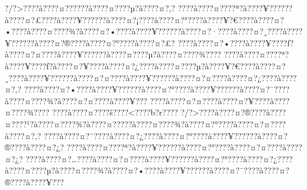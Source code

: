 \documentclass[11pt, openany]{book}
\begin{document}
?/?\textgreater{}???\textbar{}?à???\textbar{}?¤?????\textbar{}?à???\textbar{}?¤???\textbar{}?µ?à???\textbar{}?¤?‚?
???\textbar{}?à???\textbar{}?¤???\textbar{}?ª?à???\textbar{}?¥?????\textbar{}?à???\textbar{}?¤?£???\textbar{}?à???\textbar{}?¥?????\textbar{}?à???\textbar{}?¤?¡???\textbar{}?à???\textbar{}?¤?°???\textbar{}?à???\textbar{}?¥?€???\textbar{}?à???\textbar{}?¤?•???\textbar{}?à???\textbar{}?¤???\textbar{}?¾?à???\textbar{}?¤?•???\textbar{}?à???\textbar{}?¥?????\textbar{}?à???\textbar{}?¤?·???\textbar{}?à???\textbar{}?¤?¸???\textbar{}?à???\textbar{}?¥?????\textbar{}?à???\textbar{}?¤?®???\textbar{}?à???\textbar{}?¤?°???\textbar{}?à???\textbar{}?¤?£?
???\textbar{}?à???\textbar{}?¤?•???\textbar{}?à???\textbar{}?¥???\textbar{}?ƒ?à???\textbar{}?¤?¤???\textbar{}?à???\textbar{}?¥?????\textbar{}?à???\textbar{}?¤???\textbar{}?µ?à???\textbar{}?¤???\textbar{}?¾???\textbar{}?
???\textbar{}?à???\textbar{}?¤???\textbar{}?ª?à???\textbar{}?¥???\textbar{}?ƒ?à???\textbar{}?¤?¥???\textbar{}?à???\textbar{}?¤?¿???\textbar{}?à???\textbar{}?¤???\textbar{}?µ?à???\textbar{}?¥?€???\textbar{}?à???\textbar{}?¤?¸???\textbar{}?à???\textbar{}?¥?????\textbar{}?à???\textbar{}?¤?¤???\textbar{}?à???\textbar{}?¥?????\textbar{}?à???\textbar{}?¤?¤???\textbar{}?à???\textbar{}?¤?¿???\textbar{}?à???\textbar{}?¤?‚?
???\textbar{}?à???\textbar{}?¤?•???\textbar{}?à???\textbar{}?¥?????\textbar{}?à???\textbar{}?¤?°???\textbar{}?à???\textbar{}?¥?????\textbar{}?à???\textbar{}?¤?¯???\textbar{}?à???\textbar{}?¤???\textbar{}?¾?à???\textbar{}?¤?¤???\textbar{}?à???\textbar{}?¥???
???\textbar{}?à???\textbar{}?¤?¤???\textbar{}?à???\textbar{}?¤?¥???\textbar{}?à???\textbar{}?¤???\textbar{}?¾???\textbar{}?
???\textbar{}?à???\textbar{}?¤???\textbar{}?š???\textbar{}?\textless{}???\textbar{}?b?r???\textbar{}?
?/?\textgreater{}???\textbar{}?à???\textbar{}?¤?®???\textbar{}?à???\textbar{}?¤???\textbar{}?¹?à???\textbar{}?¤???\textbar{}?¾?à???\textbar{}?¤?­???\textbar{}?à???\textbar{}?¤???\textbar{}?¾?à???\textbar{}?¤?°???\textbar{}?à???\textbar{}?¤?¤???\textbar{}?à???\textbar{}?¤?‚?
???\textbar{}?à???\textbar{}?¤?¨???\textbar{}?à???\textbar{}?¤?¿???\textbar{}?à???\textbar{}?¤?°???\textbar{}?à???\textbar{}?¥?????\textbar{}?à???\textbar{}?¤?®???\textbar{}?à???\textbar{}?¤?¿?
???\textbar{}?à???\textbar{}?¤???\textbar{}?ª?à???\textbar{}?¥?????\textbar{}?à???\textbar{}?¤?°???\textbar{}?à???\textbar{}?¤?¤???\textbar{}?à???\textbar{}?¤?¿?
???\textbar{}?à???\textbar{}?¤?\ldots{}???\textbar{}?à???\textbar{}?¤?¤???\textbar{}?à???\textbar{}?¥?????\textbar{}?à???\textbar{}?¤?°???\textbar{}?à???\textbar{}?¤?¿???\textbar{}?à???\textbar{}?¤???\textbar{}?µ?à???\textbar{}?¤???\textbar{}?¾?à???\textbar{}?¤?•???\textbar{}?à???\textbar{}?¥?????\textbar{}?à???\textbar{}?¤?¯???\textbar{}?à???\textbar{}?¤?®???\textbar{}?à???\textbar{}?¥???
\end{document}
